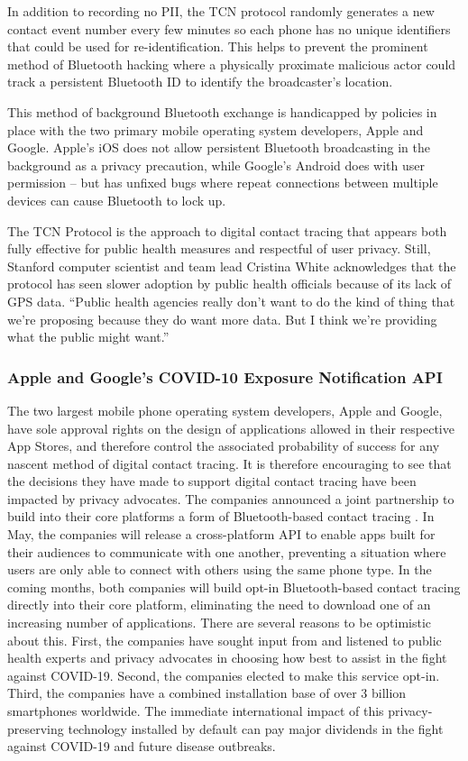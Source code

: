 \documentclass{article}
\begin{document}
In addition to recording no PII, the TCN protocol randomly generates a new contact event number every few minutes so each phone has no unique identifiers that could be used for re-identification. This helps to prevent the prominent method of Bluetooth hacking where a physically proximate malicious actor could track a persistent Bluetooth ID to identify the broadcaster’s location.

This method of background Bluetooth exchange is handicapped by policies in place with the two primary mobile operating system developers, Apple and Google. Apple’s iOS does not allow persistent Bluetooth broadcasting in the background as a privacy precaution, while Google’s Android does with user permission – but has unfixed bugs where repeat connections between multiple devices can cause Bluetooth to lock up.

The TCN Protocol is the approach to digital contact tracing that appears both fully effective for public health measures and respectful of user privacy. Still, Stanford computer scientist and team lead Cristina White acknowledges that the protocol has seen slower adoption by public health officials because of its lack of GPS data. “Public health agencies really don’t want to do the kind of thing that we’re proposing because they do want more data. But I think we’re providing what the public might want.” \cite{CryptoProtection}

\subsubsection{Apple and Google's COVID-10 Exposure Notification API}
The two largest mobile phone operating system developers, Apple and Google, have sole approval rights on the design of applications allowed in their respective App Stores, and therefore control the associated probability of success for any nascent method of digital contact tracing. It is therefore encouraging to see that the decisions they have made to support digital contact tracing have been impacted by privacy advocates. The companies announced a joint partnership to build into their core platforms a form of Bluetooth-based contact tracing \cite{AppleGoogle}. In May, the companies will release a cross-platform API to enable apps built for their audiences to communicate with one another, preventing a situation where users are only able to connect with others using the same phone type. In the coming months, both companies will build opt-in Bluetooth-based contact tracing directly into their core platform, eliminating the need to download one of an increasing number of applications. There are several reasons to be optimistic about this. First, the companies have sought input from and listened to public health experts and privacy advocates in choosing how best to assist in the fight against COVID-19. Second, the companies elected to make this service opt-in. Third, the companies have a combined installation base of over 3 billion smartphones worldwide. The immediate international impact of this privacy-preserving technology installed by default can pay major dividends in the fight against COVID-19 and future disease outbreaks.
\end{document}
